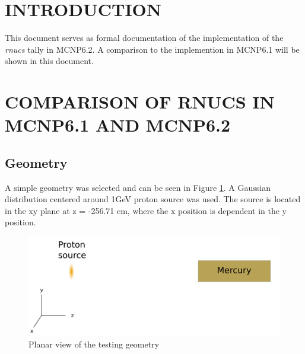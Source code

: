 \section{INTRODUCTION}

This document serves as formal documentation of the implementation of
the \textit{rnucs} tally in MCNP6.2. A comparison to the implemention
in MCNP6.1 will be shown in this document. 

\section{COMPARISON OF RNUCS IN MCNP6.1 AND MCNP6.2}

\subsection{Geometry}
A simple geometry was selected and can be seen in Figure \ref{fig:merbox.png}.
A Gaussian distribution centered around 1GeV proton source was used. 
The source is located in the xy plane at z = -256.71 cm, where the x position is
dependent in the y position. 


\begin{figure}[h!]
        \centering
        \includegraphics[scale=0.7]{figs/mercury.png}
        \caption[VPI]{Planar view of the testing geometry}
        \label{fig:merbox.png}
\end{figure}

